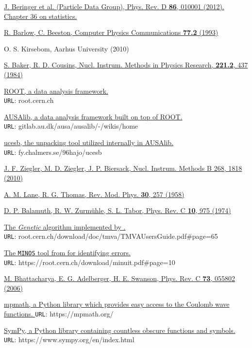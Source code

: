\begin{thebibliography}{}
\href{https://doi.org/10.1103/PhysRevD.86.010001}{J. Beringer et al. (Particle Data Group), Phys. Rev. D \textbf{86}, 010001 (2012). Chapter 36 on statistics.}

\href{https://doi.org/10.1016/0010-4655(93)90005-W}{R. Barlow, C. Beeston, Computer Physics Communications \textbf{77.2} (1993)}

O. S. Kirsebom, Aarhus University (2010)

\href{https://doi.org/https://doi.org/10.1016/0167-5087(84)90016-4}{S. Baker, R. D. Cousins, Nucl. Instrum. Methods in Physics Research, \textbf{221.2}, 437 (1984)}

\href{https://root.cern.ch/}{ROOT, a \CPP{} data analysis framework.} \\
\texttt{URL}: root.cern.ch

\href{https://gitlab.au.dk/ausa/ausalib/-/wikis/home}{AUSAlib, a \CPP{} data analysis framework built on top of ROOT.} \\
\texttt{URL}: gitlab.au.dk/ausa/ausalib/-/wikis/home

\href{http://fy.chalmers.se/~f96hajo/ucesb/}{ucesb, the unpacking tool utilized internally in AUSAlib.} \\
\texttt{URL}: fy.chalmers.se/\textapprox{}96hajo/ucesb

\href{https://doi.org/10.1016/j.nimb.2010.02.091}{J. F. Ziegler, M. D. Ziegler, J. P. Biersack, Nucl. Instrum. Methods B 268, 1818 (2010)}

\href{https://doi.org/10.1103/RevModPhys.30.257}{A. M. Lane, R. G. Thomas, Rev. Mod. Phys. \textbf{30}, 257 (1958)}

\href{https://doi.org/10.1103/PhysRevC.10.975}{D. P. Balamuth, R. W. Zurmühle, S. L. Tabor, Phys. Rev. C \textbf{10}, 975 (1974)}

\href{https://root.cern.ch/download/doc/tmva/TMVAUsersGuide.pdf#page=65}{The \textit{Genetic} algorithm implemented by \ROOT{}.}\\ \texttt{URL}: root.cern.ch/download/doc/tmva/TMVAUsersGuide.pdf\#page=65

\href{https://root.cern.ch/download/minuit.pdf}{The \texttt{MINOS} tool from \ROOT{} for identifying errors.}\\ \texttt{URL}: https://root.cern.ch/download/minuit.pdf\#page=10

\href{https://doi.org/10.1103/PhysRevC.73.055802}{M. Bhattacharya, E. G. Adelberger, H. E. Swanson, Phys. Rev. C \textbf{73}, 055802 (2006)}

\href{https://mpmath.org/}{mpmath, a Python library which provides easy access to the Coulomb wave functions. } \texttt{URL}: https://mpmath.org/

\href{https://www.sympy.org/en/index.html}{SymPy, a Python library containing countless obscure functions and symbols. } \texttt{URL}: https://www.sympy.org/en/index.html

\end{thebibliography}